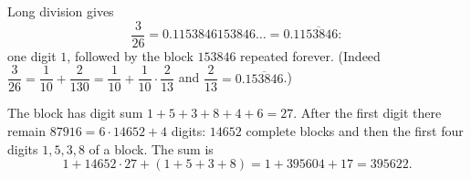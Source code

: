 Long division gives
\[\dfrac{3}{26}=0.1153846153846\ldots=0.1\overline{153846}:\]
one digit $1$, followed by the block $153846$ repeated forever. (Indeed $\dfrac3{26}=\dfrac1{10}+\dfrac{2}{130}=\dfrac1{10}+\dfrac{1}{10}\cdot\dfrac{2}{13}$ and $\dfrac2{13}=0.\overline{153846}$.)

The block has digit sum $1+5+3+8+4+6=27$. After the first digit there remain $87916=6\cdot14652+4$ digits: $14652$ complete blocks and then the first four digits $1,5,3,8$ of a block. The sum is
\[1+14652\cdot27+(1+5+3+8)=1+395604+17=\boxed{395622}.\]
